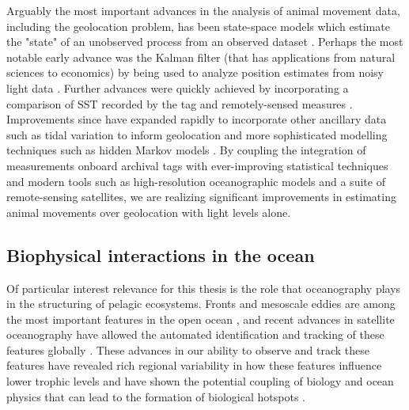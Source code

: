 Arguably the most important advances in the analysis of animal movement data, including the geolocation problem, has been state-space models which estimate the "state" of an unobserved process from an observed dataset \citep{Jonsen2013}. 
Perhaps the most notable early advance was the Kalman filter (that has applications from natural sciences to economics) by \cite{Sibert2001} being used to analyze position estimates from noisy light data \citep{Hill2001}. Further advances were quickly achieved by incorporating a comparison of \is SST recorded by the tag and remotely-sensed measures \citep{Teo2004, Nielsen2006}. Improvements since have expanded rapidly to incorporate other ancillary data such as tidal variation \citep[\eg][]{Metcalfe1997} to inform geolocation and more sophisticated modelling techniques such as hidden Markov models \citep[\eg][]{Pedersen2008}. By coupling the integration of \is measurements onboard archival tags with ever-improving statistical techniques and modern tools such as high-resolution oceanographic models and a suite of remote-sensing satellites, we are realizing significant improvements in estimating animal movements over geolocation with light levels alone.

\subsection{Biophysical interactions in the ocean}


Of particular interest relevance for this thesis is the role that oceanography plays in the structuring of pelagic ecosystems. Fronts and mesoscale eddies are among the most important features in the open ocean \citep{Chelton2011, McGillicuddy2016, Mahadevan2016}, and recent advances in satellite oceanography have allowed the automated identification and tracking of these features globally \citep{Chelton2011, Belkin2009}. These advances in our ability to observe and track these features have revealed rich regional variability in how these features influence lower trophic levels \citep{McGillicuddy2016, Gaube2017DSR} and have shown the potential coupling of biology and ocean physics that can lead to the formation of biological hotspots \citep{Mann2006, Belkin2014}.


